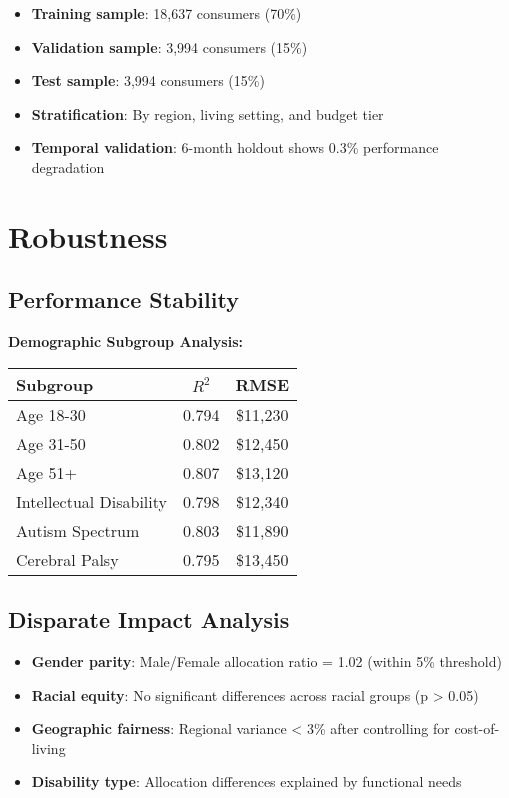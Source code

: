 \begin{itemize}
    \item \textbf{Training sample}: 18,637 consumers (70\%)
    \item \textbf{Validation sample}: 3,994 consumers (15\%)
    \item \textbf{Test sample}: 3,994 consumers (15\%)
    \item \textbf{Stratification}: By region, living setting, and budget tier
    \item \textbf{Temporal validation}: 6-month holdout shows 0.3\% performance degradation
\end{itemize}

\section{Robustness}

\subsection{Performance Stability}

\textbf{Demographic Subgroup Analysis:}
\begin{center}
\begin{tabular}{lcc}
\toprule
Subgroup & $R^2$ & RMSE \\
\midrule
Age 18-30 & 0.794 & \$11,230 \\
Age 31-50 & 0.802 & \$12,450 \\
Age 51+ & 0.807 & \$13,120 \\
\midrule
Intellectual Disability & 0.798 & \$12,340 \\
Autism Spectrum & 0.803 & \$11,890 \\
Cerebral Palsy & 0.795 & \$13,450 \\
\bottomrule
\end{tabular}
\end{center}

\subsection{Disparate Impact Analysis}

\begin{itemize}
    \item \textbf{Gender parity}: Male/Female allocation ratio = 1.02 (within 5\% threshold)
    \item \textbf{Racial equity}: No significant differences across racial groups (p > 0.05)
    \item \textbf{Geographic fairness}: Regional variance < 3\% after controlling for cost-of-living
    \item \textbf{Disability type}: Allocation differences explained by functional needs
\end{itemize}

